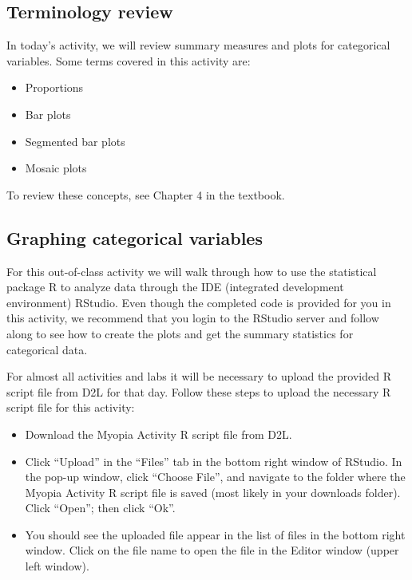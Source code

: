 \documentclass[
]{report}
\providecommand{\tightlist}{%
  \setlength{\itemsep}{0pt}\setlength{\parskip}{0pt}}
\begin{document}
\hypertarget{terminology-review-4}{%
\subsection{Terminology review}\label{terminology-review-4}}

In today's activity, we will review summary measures and plots for categorical variables. Some terms covered in this activity are:

\begin{itemize}
\item
  Proportions
\item
  Bar plots
\item
  Segmented bar plots
\item
  Mosaic plots
\end{itemize}

To review these concepts, see Chapter 4 in the textbook.

\hypertarget{graphing-categorical-variables}{%
\subsection{Graphing categorical variables}\label{graphing-categorical-variables}}

For this out-of-class activity we will walk through how to use the statistical package R to analyze data through the IDE (integrated development environment) RStudio. Even though the completed code is provided for you in this activity, we recommend that you login to the RStudio server and follow along to see how to create the plots and get the summary statistics for categorical data.

For almost all activities and labs it will be necessary to upload the provided R script file from D2L for that day. Follow these steps to upload the necessary R script file for this activity:

\begin{itemize}
\tightlist
\item
  Download the Myopia Activity R script file from D2L.
\item
  Click ``Upload'' in the ``Files'' tab in the bottom right window of RStudio. In the pop-up window, click ``Choose File'', and navigate to the folder where the Myopia Activity R script file is saved (most likely in your downloads folder). Click ``Open''; then click ``Ok''.
\item
  You should see the uploaded file appear in the list of files in the bottom right window. Click on the file name to open the file in the Editor window (upper left window).
\end{itemize}
\end{document}
